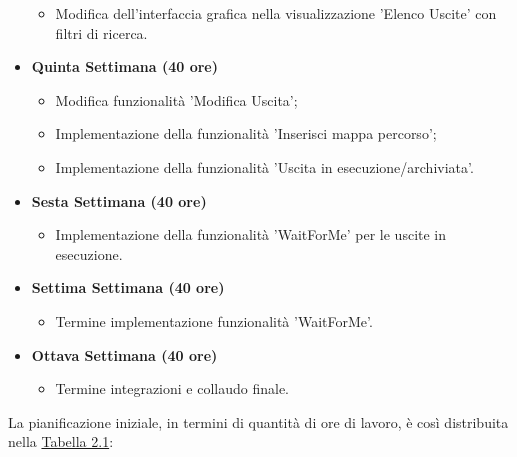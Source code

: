 \begin{itemize}
\begin{itemize}
		\item Modifica dell'interfaccia grafica nella visualizzazione 'Elenco Uscite' con filtri di ricerca.
	\end{itemize}
	\item \textbf{Quinta Settimana (40 ore)} 
	\begin{itemize}
		\item Modifica funzionalità 'Modifica Uscita';
		\item Implementazione della funzionalità 'Inserisci mappa percorso';
		\item Implementazione della funzionalità 'Uscita in esecuzione/archiviata'.
	\end{itemize}
	\item \textbf{Sesta Settimana (40 ore)} 
	\begin{itemize}
		\item Implementazione della funzionalità 'WaitForMe' per le uscite in esecuzione.
	\end{itemize}
	\item \textbf{Settima Settimana (40 ore)} 
	\begin{itemize}
		\item Termine implementazione funzionalità 'WaitForMe'.
	\end{itemize}
	\item \textbf{Ottava Settimana (40 ore)} 
	\begin{itemize}
		\item Termine integrazioni e collaudo finale.
	\end{itemize}
\end{itemize}
\newpage
La pianificazione iniziale, in termini di quantità di ore di lavoro, è così distribuita nella \hyperref[tab:Tabella riassuntiva della pianificazione iniziale di stage]{Tabella 2.1}:

